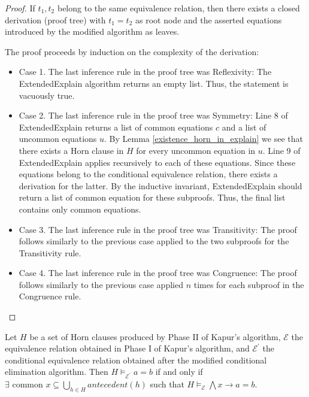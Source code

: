 \begin{proof} 
  If $t_1, t_2$ belong to the same equivalence relation,
  then there exists a closed derivation (proof tree) 
  with $t_1 = t_2$ as root node and the asserted
  equations introduced by the modified algorithm
  as leaves.

  The proof proceeds by induction on the complexity of the 
  derivation:

  \begin{itemize}
    \item Case 1. The last inference rule in the proof 
      tree was Reflexivity: The ExtendedExplain 
      algorithm returns an empty list. Thus, the
      statement is vacuously true.
    \item Case 2. The last inference rule in the proof 
      tree was Symmetry: Line 8 of ExtendedExplain
      returns a list of common equations $c$ and a list
      of uncommon equations $u$. 
      By Lemma \ref{existence_horn_in_explain}
      we see that there exists a Horn clause in $H$ for
      every uncommon equation in $u$. Line 9 of 
      ExtendedExplain applies recursively to each of 
      these equations. Since these equations belong
      to the conditional equivalence relation, there
      exists a derivation for the latter.
      By the inductive invariant, ExtendedExplain
      should return a list of common equation for 
      these subproofs. Thus, the final list contains
      only common equations.
    \item Case 3. The last inference rule in the proof 
      tree was Transitivity: The proof follows similarly
      to the previous case applied to the two subproofs
      for the Transitivity rule.
    \item Case 4. The last inference rule in the proof 
      tree was Congruence: The proof follows similarly
      to the previous case applied $n$ times for each
      subproof in the Congruence rule.
  \end{itemize}
\end{proof}

\begin{corollary} \label{commonantecedentcorollary}
  Let $H$ be a set of Horn clauses produced by 
  Phase II of Kapur's algorithm, $\mathcal{E}$ the 
  equivalence relation obtained in Phase I of Kapur's 
  algorithm, and $\mathcal{E^{'}}$ the conditional 
  equivalence relation obtained after the modified
  conditional elimination algorithm. Then
  $H \models_{\mathcal{E^{'}}} a = b$ if and only if
  $\exists \text{ common } x \subseteq 
  \bigcup_{h \in H} antecedent(h)$ such that
  $H \models_{\mathcal{E}} \bigwedge x \rightarrow a = b$.
\end{corollary}

